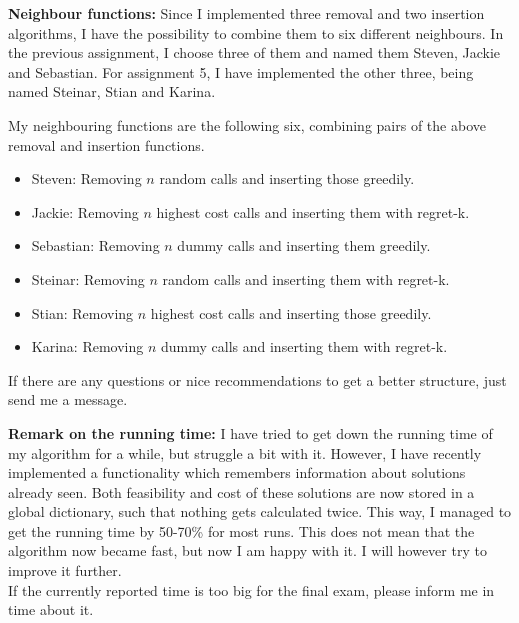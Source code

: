 \documentclass[a4paper,11pt]{article}
\theoremstyle{mytheor}
\begin{document}
\textbf{Neighbour functions: }Since I implemented three removal and two insertion algorithms, I have the possibility to combine them to six different neighbours. In the previous assignment, I choose three of them and named them Steven, Jackie and Sebastian. For assignment 5, I have implemented the other three, being named Steinar, Stian and Karina.\medskip

My neighbouring functions are the following six, combining pairs of the above removal and insertion functions.
\begin{itemize}
\item Steven: Removing $n$ random calls and inserting those greedily.
\item Jackie: Removing $n$ highest cost calls and inserting them with regret-k.
\item Sebastian: Removing $n$ dummy calls and inserting them greedily.
\item Steinar: Removing $n$ random calls and inserting them with regret-k.
\item Stian: Removing $n$ highest cost calls and inserting those greedily.
\item Karina: Removing $n$ dummy calls and inserting them with regret-k.
\end{itemize}

\medskip
If there are any questions or nice recommendations to get a better structure, just send me a message.\medskip

\textbf{Remark on the running time: }I have tried to get down the running time of my algorithm for a while, but struggle a bit with it. However, I have recently implemented a functionality which remembers information about solutions already seen. Both feasibility and cost of these solutions are now stored in a global dictionary, such that nothing gets calculated twice. This way, I managed to get the running time by 50-70\% for most runs. This does not mean that the algorithm now became fast, but now I am happy with it. I will however try to improve it further.\\
If the currently reported time is too big for the final exam, please inform me in time about it.
\end{document}
